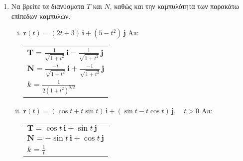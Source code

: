 \documentclass[a4paper,table]{report}
\begin{document}
\begin{enumerate}
  \item Να βρείτε τα διανύσματα $ T $ και $N$, καθώς και την καμπυλότητα των παρακάτω 
    επίπεδων καμπυλών.
    \begin{enumerate}[i)]
      \item $ \mathbf{r}(t)=(2t+3)\, \mathbf{i} + (5-t^{2})\, \mathbf{j} $ 
        \hfill Απ: \begin{tabular}{l}
          $ \mathbf{T} =  \frac{1}{\sqrt{1+t^{2}}}\,\mathbf{i} -
          \frac{1}{\sqrt{1+t^{2}}}\,\mathbf{j} $
          \\
          $ \mathbf{N}=  \frac{-t}{\sqrt{1+t^{2}}}\,\mathbf{i} + 
          \frac{-1}{\sqrt{1+t^{2}}} \,\mathbf{j} $ \\
        $ k= \frac{1}{2(1+t^{2})^{3/2}} $ 
        \end{tabular} 
      \item $ \mathbf{r}(t)=(\cos{t} + t \sin{t})\, \mathbf{i} + (\sin{t} - t
        \cos{t})\, \mathbf{j} , \quad t>0 $
        \hfill Απ: \begin{tabular}{l}
          $ \mathbf{T}=  \cos{t}\,\mathbf{i} + \sin{t}\,\mathbf{j} $ \\
          $ \mathbf{N}=  - \sin{t}\,\mathbf{i} + \cos{t}\,\mathbf{j} $ \\
          $ k = \frac{1}{t} $
        \end{tabular} 
    \end{enumerate}


\end{enumerate}
\end{document}
